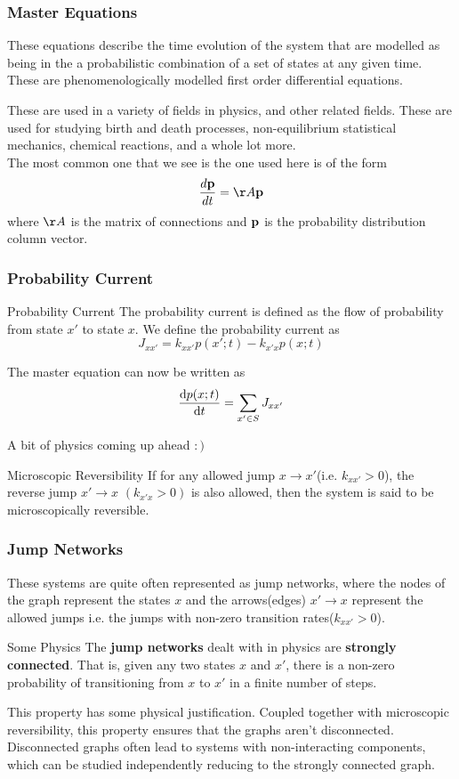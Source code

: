 \documentclass[9pt]{beamer}
\begin{document}
\begin{frame}
    \frametitle{Master Equations}
    These equations describe the time evolution of the system that are modelled as being in the
    a probabilistic combination of a set of states at any given time. These are phenomenologically modelled 
    first order differential equations. 

    These are used in a variety of fields in physics, and other related fields. These are used for 
    studying birth and death processes, non-equilibrium statistical mechanics, chemical reactions, and a whole lot more. \\ 

    The most common one that we see is the one used here is of the form 
    $$ \frac{d \bold{p}}{ dt} = \AA \bold{p} $$
    where $\AA$ is the matrix of connections and $\bold{p}$ is the probability distribution column vector.
\end{frame}
\begin{frame}
  \frametitle{Probability Current}
  \begin{block}{Probability Current}
    The probability current is defined as the flow of probability from state $x'$ to state $x$.
    We define the probability current as
    $$J_{xx'} = k_{xx'}p(x';t) - k_{x'x}p(x;t)$$
  \end{block}
    The master equation can now be written as
    $$\dv{p(x;t)}{t} = \sum_{x' \in S} J_{xx'}$$

    A bit of physics coming up ahead $:)$
    
    \begin{block}{Microscopic Reversibility}
      If for any allowed jump $x \rightarrow x'$(i.e. $k_{xx'} > 0$), the reverse jump $x' \rightarrow x$ $(k_{x'x}>0)$ is also allowed, then the system is said to be microscopically reversible.
  
    \end{block}

\end{frame}
\begin{frame}
  \frametitle{Jump Networks}
  These systems are quite often represented as jump networks, where the nodes of the graph 
  represent the states $x$ and the arrows(edges) $ x' \rightarrow x$ represent the allowed jumps  
  i.e. the jumps with non-zero transition rates($k_{xx'}>0$).

  \begin{block}{Some Physics}
    The \textbf{jump networks} dealt with in physics are \textbf{strongly connected}. 
    That is, given any two states $x$ and $x'$, there is a non-zero probability 
    of transitioning from $x$ to $x'$ in a finite number of steps.
\end{block}
This property has some physical justification. Coupled together with microscopic reversibility, 
this property ensures that the graphs aren't disconnected. Disconnected graphs often lead to systems 
with non-interacting components, which can be studied independently reducing to the strongly connected graph.
\\
\end{frame}
\end{document}
